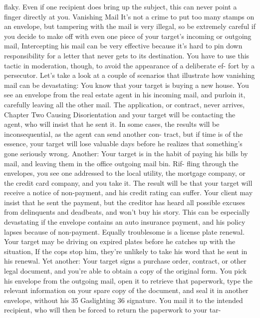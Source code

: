 \documentclass{book}
\begin{document}
flaky. Even if one recipient does bring up the subject, this can 
never point a finger directly at you. 
Vanishing Mail 
It's not a crime to put too many stamps on an envelope, but 
tampering with the mail is very illegal, so be extremely careful 
if you decide to make off with even one piece of your target's 
incoming or outgoing mail, Intercepting his mail can be very 
effective because it’s hard to pin down responsibility for a letter 
that never gets to its destination. You have to use this tactic in 
moderation, though, to avoid the appearance of a deliberate ef- 
fort by a persecutor. Let's take a look at a couple of scenarios 
that illustrate how vanishing mail can be devastating: 
You know that your target is buying a new house. 
You see an envelope from the real estate agent in his 
incoming mail, and purloin it, carefully leaving all the 
other mail. The application, or contract, never arrives, 
Chapter Two 
Causing Disorientation 
and your target will be contacting the agent, who will 
insist that he sent it. In some cases, the results will be 
inconsequential, as the agent can send another con- 
tract, but if time is of the essence, your target will lose 
valuable days before he realizes that something's gone 
seriously wrong. 
Another: 
Your target is in the habit of paying his bills by mail, 
and leaving them in the office outgoing mail bin. Rif- 
fling through the envelopes, you see one addressed to 
the local utility, the mortgage company, or the credit 
card company, and you take it. The result will be that 
your target will receive a notice of non-payment, and 
his credit rating can suffer. Your client may insist that 
he sent the payment, but the creditor has heard all 
possible excuses from delinquents and deadbeats, and 
won't buy his story. 
This can be especially devastating if the envelope 
contains an auto insurance payment, and his policy 
lapses because of non-payment. Equally troublesome is 
a license plate renewal. Your target may be driving on 
expired plates before he catches up with the situation, 
If the cops stop him, they're unlikely to take his word 
that he sent in his renewal. 
Yet another: 
Your target signs a purchase order, contract, or 
other legal document, and you're able to obtain a copy 
of the original form. You pick his envelope from the 
outgoing mail, open it to retrieve that paperwork, type 
the relevant information on your spare copy of the 
document, and seal it in another envelope, without his 35  Gaslighting 
36 
signature. You mail it to the intended recipient, who 
will then be forced to return the paperwork to your tar- 
\end{document}
